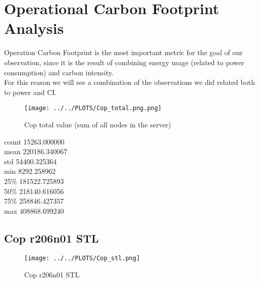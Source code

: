 \section{Operational Carbon Footprint Analysis}
Operation Carbon Footprint is the most important metric for the goal of our observation, since it is the result of combining energy usage (related to power consumption) and carbon intensity. \\
For this reason we will see a combination of the observations we did related both to power and CI.

\vspace{-15pt}

\begin{figure}[H]
\centering
\texttt{[image: ../../PLOTS/Cop\_total.png.png]}
\captionsetup{skip=-10pt}
\caption{Cop total value (sum of all nodes in the server)}
\label{fig:Cop_total}
\end{figure}

\begin{center}
count     15263.000000 \\
mean     220186.340067 \\
std       54400.325364 \\
min        8292.258962 \\
25\%      181522.725893 \\
50\%      218140.616056 \\
75\%      258846.427357 \\
max      408868.699240   
\end{center}

\subsection{Cop r206n01 STL}

\vspace{-10pt}

\begin{figure}[H]
\centering
\texttt{[image: ../../PLOTS/Cop\_stl.png]}
\caption{Cop r206n01 STL}
\label{fig:Cop_r206n01_stl}
\end{figure}
